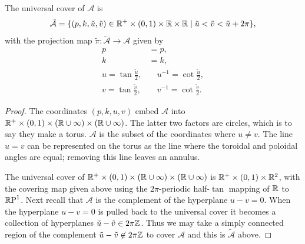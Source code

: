 \documentclass{article}
\begin{document}
\begin{lem}\label{lem:mathcal tilde C}
The universal cover of $\mathcal{A}$ is
\[
\mathcal{\tilde{A}} =
\{(p, k,\tilde{u},\tilde{v}) \in \mathbb{R}^+\times(0,1)\times\mathbb{R}\times\mathbb{R} \mid  \tilde{u} < \tilde{v} < \tilde{u} + 2\pi \},
\]
with the projection map $\tilde{\pi} : \mathcal{\tilde{A}} \to \mathcal{A}$ given by
\begin{align*}
    p &= p, \\
    k &= k, \\
    u = \tan \frac{\tilde{u}}{2},       &\quad
        u^{-1} = \cot \frac{\tilde{u}}{2},  \\
    v = \tan \frac{\tilde{v}}{2},       &\quad
        v^{-1} = \cot \frac{\tilde{v}}{2}.
\end{align*}

\begin{proof}
The coordinates $(p,k,u,v)$ embed $\mathcal{A}$ into $\mathbb{R}^+\times(0,1)\times(\mathbb{R} \cup\infty)\times(\mathbb{R} \cup\infty)$.
The latter two factors are circles, which is to say they make a torus. $\mathcal{A}$ is the subset of the coordinates where $u\neq v$. The line $u=v$ can be represented on the torus as the line where the toroidal and poloidal angles are equal; removing this line leaves an annulus.

The universal cover of $\mathbb{R}^+\times(0,1)\times(\mathbb{R} \cup\infty)\times(\mathbb{R} \cup\infty)$ is $\mathbb{R}^+\times(0,1)\times\mathbb{R}^2$, with the covering map given above using the $2\pi$-periodic half-$\tan$ mapping of $\mathbb{R}$ to $\mathbb{R}\text{P}^1$. Next recall that $\mathcal{A}$ is the complement of the hyperplane $u-v = 0$. When the hyperplane $u-v=0$ is pulled back to the universal cover it becomes a collection of hyperplanes $\tilde{u}-\tilde{v} \in 2\pi\mathbb{Z}$. Thus we may take a simply connected region of the complement $\tilde{u}-\tilde{v} \not\in 2\pi\mathbb{Z}$ to cover $\mathcal{A}$ and this is $\mathcal{\tilde{A}}$ above.




\end{proof}
\end{lem}
\end{document}
